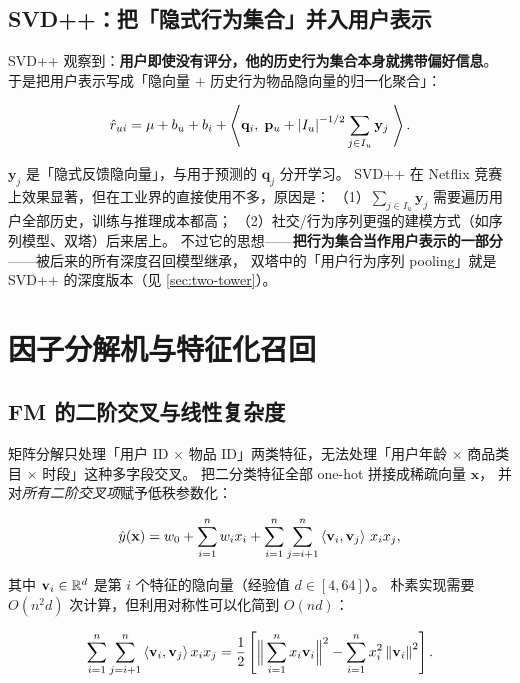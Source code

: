 \subsection{SVD++：把「隐式行为集合」并入用户表示}

SVD++ 观察到：\textbf{用户即使没有评分，他的历史行为集合本身就携带偏好信息}。
于是把用户表示写成「隐向量 $+$ 历史行为物品隐向量的归一化聚合」：

\begin{equation}
\hat r_{ui} = \mu + b_u + b_i + \left\langle \mathbf{q}_i, \; \mathbf{p}_u + \left\lvert I_u \right\rvert^{-1/2} \sum_{j \in I_u} \mathbf{y}_j \; \right\rangle .
\label{eq:svdpp}
\end{equation}

$\mathbf{y}_j$ 是「隐式反馈隐向量」，与用于预测的 $\mathbf{q}_j$ 分开学习。
SVD++ 在 Netflix 竞赛上效果显著，但在工业界的直接使用不多，原因是：
（1）$\sum_{j \in I_u} \mathbf{y}_j$ 需要遍历用户全部历史，训练与推理成本都高；
（2）社交/行为序列更强的建模方式（如序列模型、双塔）后来居上。
不过它的思想——\textbf{把行为集合当作用户表示的一部分}——被后来的所有深度召回模型继承，
双塔中的「用户行为序列 pooling」就是 SVD++ 的深度版本（见 \cref{sec:two-tower}）。

\section{因子分解机与特征化召回}

\subsection{FM 的二阶交叉与线性复杂度}

矩阵分解只处理「用户 ID $\times$ 物品 ID」两类特征，无法处理「用户年龄 $\times$ 商品类目 $\times$ 时段」这种多字段交叉。
\cite{rendle2010fm} 把二分类特征全部 one-hot 拼接成稀疏向量 $\mathbf{x}$，
并对\emph{所有二阶交叉项}赋予低秩参数化：

\begin{equation}
\hat y(\mathbf{x}) = w_0 + \sum_{i=1}^{n} w_i x_i + \sum_{i=1}^{n} \sum_{j=i+1}^{n} \left\langle \mathbf{v}_i, \mathbf{v}_j \right\rangle \, x_i x_j ,
\label{eq:fm}
\end{equation}

其中 $\mathbf{v}_i \in \mathbb{R}^{d}$ 是第 $i$ 个特征的隐向量（经验值 $d \in [4, 64]$）。
朴素实现需要 $O(n^2 d)$ 次计算，但利用对称性可以化简到 $O(nd)$：

\begin{equation}
\sum_{i=1}^{n}\sum_{j=i+1}^{n} \left\langle \mathbf{v}_i, \mathbf{v}_j \right\rangle x_i x_j
= \frac{1}{2} \left[
\Big\lVert \sum_{i=1}^{n} x_i \mathbf{v}_i \Big\rVert^2
- \sum_{i=1}^{n} x_i^2 \left\lVert \mathbf{v}_i \right\rVert^2
\right] .
\label{eq:fm-transform}
\end{equation}


